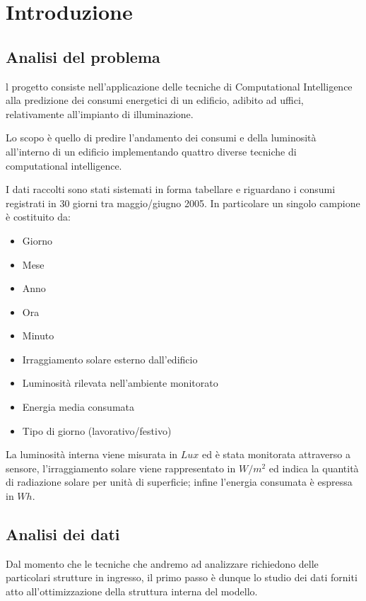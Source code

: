 
\maketitle
\clearpage


\tableofcontents
\clearpage


\section{Introduzione}
\subsection{Analisi del problema}
l progetto consiste nell'applicazione delle tecniche di Computational Intelligence alla predizione dei consumi energetici di un edificio, adibito ad uffici, relativamente all'impianto di illuminazione.

Lo scopo è quello di predire l'andamento dei consumi e della luminosità all'interno di un edificio implementando quattro diverse tecniche di computational intelligence.

I dati raccolti sono stati sistemati in forma tabellare e riguardano i consumi registrati in 30 giorni tra maggio/giugno 2005. In particolare un singolo campione è costituito da:

\begin{itemize}
  \item Giorno
  \item Mese
  \item Anno
  \item Ora
  \item Minuto
  \item Irraggiamento solare esterno dall'edificio
  \item Luminosità rilevata nell'ambiente monitorato
  \item Energia media consumata
  \item Tipo di giorno (lavorativo/festivo)
\end{itemize}

La luminosità interna viene misurata in $Lux$ ed è stata monitorata attraverso a sensore, l’irraggiamento solare viene rappresentato in $W/m^2$ ed indica la quantità di radiazione solare per unità di superficie; infine l'energia consumata è espressa in $Wh$.


\subsection{Analisi dei dati}
Dal momento che le tecniche che andremo ad analizzare richiedono delle particolari strutture in ingresso, il primo passo è dunque lo studio dei dati forniti atto all'ottimizzazione della struttura interna del modello.

